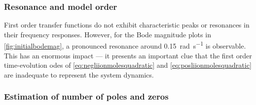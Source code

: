 \subsubsection*{Resonance and model order}

First  order  transfer   functions  do  not  exhibit   characteristic  peaks  or
resonances  in  their  frequency  responses.  However,  for  the  Bode
magnitude plots  in \cref{fig:initialbodemag},   a   pronounced   resonance   around
\SI{0.15}{\radian\per\second} is observable. This has  an enormous impact --- it
presents  an important  clue  that the  first  order time-evolution  \glspl{ode}
of \cref{eq:negliionmolesquadratic}   and \cref{eq:posliionmolesquadratic}   are
inadequate to represent the system dynamics.



\subsubsection*{Estimation of number of poles and zeros}

